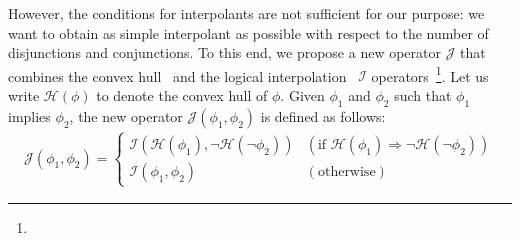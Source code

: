 However, the conditions for interpolants are not sufficient for our 
purpose: we want to obtain as simple interpolant as possible with 
respect to the number of disjunctions and conjunctions.  To this end, we 
propose a new operator \(\mathcal{J}\) that combines the convex 
hull~\cite{} and the logical interpolation~\cite{} \(\mathcal{I}\) 
operators~\footnote{}.  Let us 
write \(\mathcal{H}(\phi)\) to denote the convex hull of \(\phi\).  
Given \(\phi_1\) and \(\phi_2\) such that \(\phi_1\) implies \(\phi_2\), 
the new operator \(\mathcal{J}(\phi_1,\phi_2)\) is defined as follows:
\begin{eqnarray*}
\mathcal{J}(\phi_1,\phi_2) =
\left\{
\begin{array}{ll}
\mathcal{I}(\mathcal{H}(\phi_1),\neg \mathcal{H}(\neg \phi_2)) & (\mbox{if~}\mathcal{H}(\phi_1) \Rightarrow \neg \mathcal{H}(\neg \phi_2)) \\
\mathcal{I}(\phi_1,\phi_2) & (\mbox{otherwise})
\end{array}
\right.
\end{eqnarray*}

%
